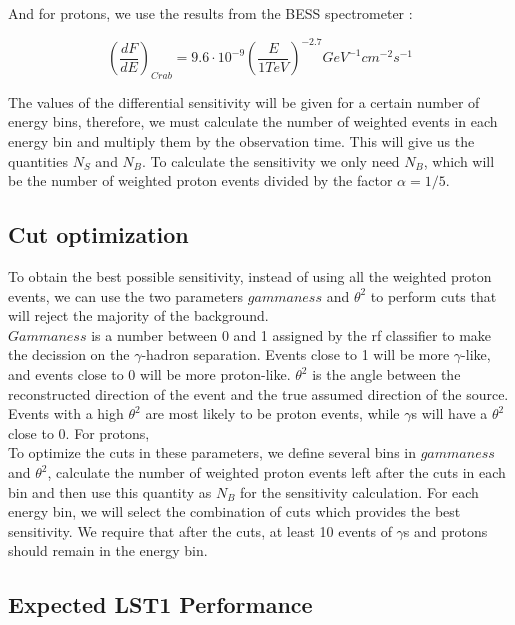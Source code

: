 \documentclass[main.tex]{subfiles}
\begin{document}
And for protons, we use the results from the BESS spectrometer \cite{2000protonBESS}:

\begin{equation}
    \left(\frac{dF}{dE}\right)_{Crab} = 9.6\cdot 10^{-9} \left(\frac{E}{1 TeV}\right)^{-2.7} GeV^{-1}cm^{-2}s^{-1}
\end{equation}

The values of the differential sensitivity will be given for a certain number of energy bins, therefore, we must calculate the number of weighted events in each energy bin and multiply them by the observation time. This will give us the quantities $N_{S}$ and $N_{B}$. To calculate the sensitivity we only need $N_{B}$, which will be the number of weighted proton events divided by the factor $\alpha = 1/5$.

\subsection{Cut optimization}

To obtain the best possible sensitivity, instead of using all the weighted proton events, we can use the two parameters $gammaness$ and $\theta^2$ to perform cuts that will reject the majority of the background.\\
$Gammaness$ is a number between 0 and 1 assigned by the \gls{rf} classifier to make the decission on the $\gamma$-hadron separation. Events close to 1 will be more $\gamma$-like, and events close to 0 will be more proton-like.
$\theta^2$ is the angle between the reconstructed direction of the event and the true assumed direction of the source. Events with a high $\theta^2$ are most likely to be proton events, while $\gamma$s will have a $\theta^2$ close to 0. For protons, 
\\
To optimize the cuts in these parameters, we define several bins in $gammaness$ and $\theta^2$, calculate the number of weighted proton events left after the cuts in each bin and then use this quantity as $N_{B}$ for the sensitivity calculation. For each energy bin, we will select the combination of cuts which provides the best sensitivity. We require that after the cuts, at least 10 events of $\gamma$s and protons should remain in the energy bin.  

\subsection{Expected LST1 Performance}\label{sec:performance}
\end{document}
